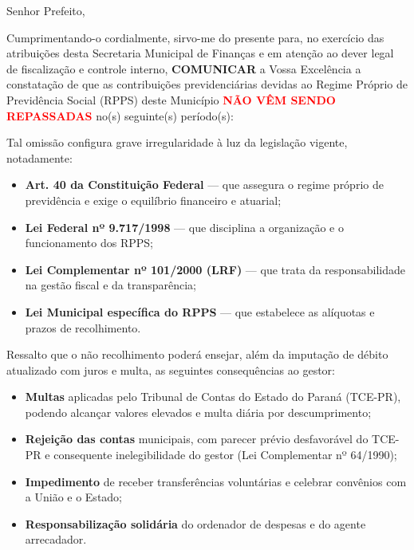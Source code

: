 \documentclass[
12pt,
a4paper,
brazil,
]{article}
\begin{document}
Senhor Prefeito,

\vspace{0.3cm}

Cumprimentando-o cordialmente, sirvo-me do presente para, no exercício das
atribuições desta Secretaria Municipal de Finanças e em atenção ao dever
legal de fiscalização e controle interno, \textbf{COMUNICAR} a Vossa
Excelência a constatação de que as contribuições previdenciárias devidas ao
Regime Próprio de Previdência Social (RPPS) deste Município
\textbf{\textcolor{red}{NÃO VÊM SENDO REPASSADAS}} no(s) seguinte(s)
período(s):

\vspace{0.4cm}

\begin{center}
\end{center}

\vspace{0.4cm}

Tal omissão configura grave irregularidade à luz da legislação vigente,
notadamente:

\begin{itemize}
  \item \textbf{Art. 40 da Constituição Federal} — que assegura o regime
    próprio de previdência e exige o equilíbrio financeiro e atuarial;
  \item \textbf{Lei Federal nº 9.717/1998} — que disciplina a organização e
    o funcionamento dos RPPS;
  \item \textbf{Lei Complementar nº 101/2000 (LRF)} — que trata da
    responsabilidade na gestão fiscal e da transparência;
  \item \textbf{Lei Municipal específica do RPPS} — que estabelece as
    alíquotas e prazos de recolhimento.
\end{itemize}

\vspace{0.2cm}

Ressalto que o não recolhimento poderá ensejar, além da imputação de
débito atualizado com juros e multa, as seguintes consequências ao gestor:

\begin{itemize}
  \item \textbf{Multas} aplicadas pelo Tribunal de Contas do Estado do
    Paraná (TCE-PR), podendo alcançar valores elevados e multa diária
    por descumprimento;
  \item \textbf{Rejeição das contas} municipais, com parecer prévio
    desfavorável do TCE-PR e consequente inelegibilidade do gestor
    (Lei Complementar nº 64/1990);
  \item \textbf{Impedimento} de receber transferências voluntárias e
    celebrar convênios com a União e o Estado;
  \item \textbf{Responsabilização solidária} do ordenador de despesas
    e do agente arrecadador.
\end{itemize}
\end{document}
